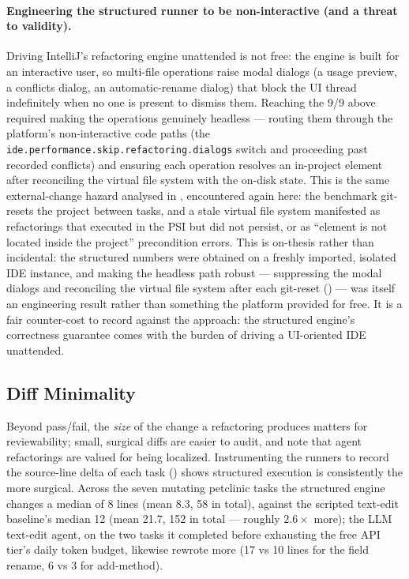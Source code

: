 \paragraph{Engineering the structured runner to be non-interactive (and a threat to
validity).} Driving IntelliJ's refactoring engine unattended is not free: the engine
is built for an interactive user, so multi-file operations raise modal dialogs (a
usage preview, a conflicts dialog, an automatic-rename dialog) that block the UI
thread indefinitely when no one is present to dismiss them. Reaching the 9/9 above
required making the operations genuinely headless --- routing them through the
platform's non-interactive code paths (the \texttt{ide.performance.skip.refactoring.dialogs}
switch and proceeding past recorded conflicts) and ensuring each operation resolves
an in-project element after reconciling the virtual file system with the on-disk
state. This is the same external-change hazard analysed in ,
encountered again here: the benchmark git-resets the project between tasks, and a
stale virtual file system manifested as refactorings that executed in the PSI but
did not persist, or as ``element is not located inside the project'' precondition
errors. This is on-thesis rather than incidental: the structured numbers were obtained
on a freshly imported, isolated IDE instance, and making the headless path robust ---
suppressing the modal dialogs and reconciling the virtual file system after each
git-reset () --- was itself an engineering result rather than
something the platform provided for free. It is a fair counter-cost to record against
the approach: the structured engine's correctness guarantee comes with the burden of
driving a UI-oriented IDE unattended.

\subsection{Diff Minimality}
\label{sec:eval-diff}
Beyond pass/fail, the \emph{size} of the change a refactoring produces matters for
reviewability; small, surgical diffs are easier to audit, and
\citet{agenticrefactoring2025} note that agent refactorings are valued for being
localized. Instrumenting the runners to record the source-line delta of each task
() shows structured execution is consistently the more surgical.
Across the seven mutating petclinic tasks the structured engine changes a median of
8 lines (mean 8.3, 58 in total), against the scripted text-edit baseline's median 12
(mean 21.7, 152 in total --- roughly $2.6\times$ more); the LLM text-edit agent, on
the two tasks it completed before exhausting the free API tier's daily token budget,
likewise rewrote more (17 vs 10 lines for the field rename, 6 vs 3 for add-method).

